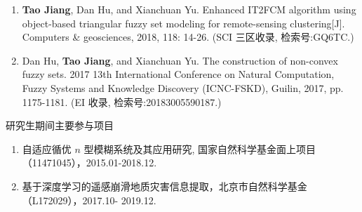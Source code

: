 \begin{paper}
\begin{enumerate}
  \item \textbf{Tao Jiang}, Dan Hu, and Xianchuan Yu.  Enhanced IT2FCM algorithm using object-based triangular fuzzy set modeling for remote-sensing clustering[J]. Computers \& geosciences, 2018, 118: 14-26. (SCI 三区收录, 检索号:GQ6TC.)
  \item Dan Hu, \textbf{Tao Jiang}, and Xianchuan Yu. The construction of non-convex fuzzy sets. 2017 13th International Conference on Natural Computation, Fuzzy Systems and Knowledge  Discovery (ICNC-FSKD), Guilin, 2017, pp. 1175-1181. (EI 收录, 检索号:20183005590187.)\\
  \end{enumerate}

\end{paper}





\begin{center}
  \large {\hei 研究生期间主要参与项目 }
\end{center}

\begin{enumerate}[(1)]
\item 自适应循优 $n$ 型模糊系统及其应用研究, 国家自然科学基金面上项目（11471045），2015.01-2018.12.

\item 基于深度学习的遥感崩滑地质灾害信息提取，北京市自然科学基金（L172029），2017.10-
2019.12.\\

\end{enumerate}

